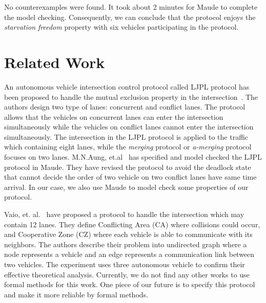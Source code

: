 \documentclass[10pt, conference, compsocconf]{IEEEtran}
\begin{document}
\noindent
No counterexamples were found. It took about 2 minutes for Maude to complete the model checking. 
Consequently, we can conclude that the protocol enjoys the \textit{starvation freedom} property with six vehicles participating in the protocol.


 
 
\section{Related Work}
 \label{sect_Relate}
 
 An autonomous vehicle intersection control protocol called LJPL protocol has been proposed to handle the mutual exclusion property in the intersection~\cite{LimJongBeom2018Aedm}.
 The authors design two type of lanes: concurrent and conflict lanes. 
 The protocol allows that the vehicles on concurrent lanes can enter the intersection simultaneously while the vehicles on conflict lanes cannot enter the intersection simultaneously.
 The intersection in the LJPL protocol is applied to the traffic which containing eight lanes, while the \textit{merging} protocol or \textit{a-merging} protocol focuses on two lanes.
 M.N.Aung, et.al~\cite{DBLP:conf/seke/AungP019} has specified and model checked the LJPL protocol in Maude.
 They have revised the protocol to avoid the deadlock state that cannot decide the order of two vehicle on two conflict lanes have same time arrival.
 In our case, we also use Maude to model check some properties of our protocol.
  
 Vaio, et. al.~\cite{8790807} have proposed a protocol to handle the intersection which may contain 12 lanes.
 They define Conflicting Area (CA) where collisions could occur, and Cooperative Zone (CZ) where each vehicle is able to communicate with its neighbors. 
 The authors describe their problem into undirected graph where a node represents a vehicle and an edge represents a communication link between two vehicles.
 The experiment uses three autonomous vehicle to confirm their effective theoretical analysis.
 Currently, we do not find any other works to use formal methods for this work.
 One piece of our future is to specify this protocol and make it more reliable by formal methods.
 
\end{document}
